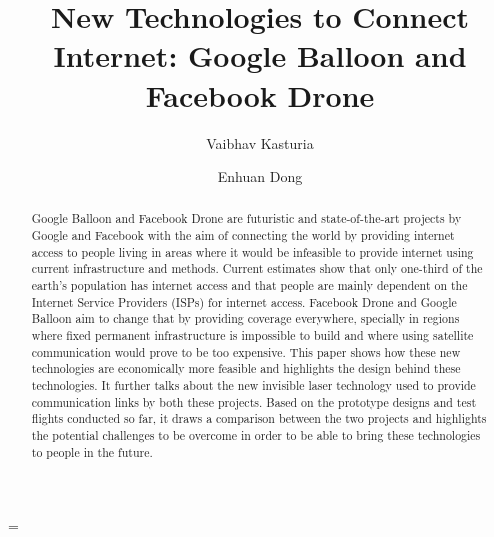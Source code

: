 \documentclass{llncs}
\begin{document}

	\title{New Technologies to Connect Internet: Google Balloon and Facebook Drone }
	
           \author{Vaibhav Kasturia \and Enhuan Dong}	
	
	
	\maketitle
	
           \emergencystretch=\maxdimen

	\begin{abstract}
	\noindent Google Balloon and Facebook Drone are futuristic and state-of-the-art projects by Google and 
	Facebook with the aim of connecting the world by providing internet access to people living in areas
	where it would be infeasible to provide internet using current infrastructure and methods. Current 
	estimates show that only one-third of the earth's population has internet access and that people are 
	mainly dependent on the Internet Service Providers (ISPs) for internet access. Facebook Drone and Google 
	Balloon aim to change that by providing coverage everywhere, specially in regions where fixed permanent  
	infrastructure is impossible to build and where using satellite communication would prove to be too expensive. 
	This paper shows how these new technologies are economically more feasible and highlights the design behind 
	these technologies. It further talks about the new invisible laser technology used to provide 
	communication links by both these projects. Based on the prototype designs and test flights conducted so far, 
	it draws a comparison between the two projects and highlights the potential challenges to be overcome in 
	order to be able to bring these technologies to people in the future. 
	    	
	\end{abstract}
	
\end{document}
